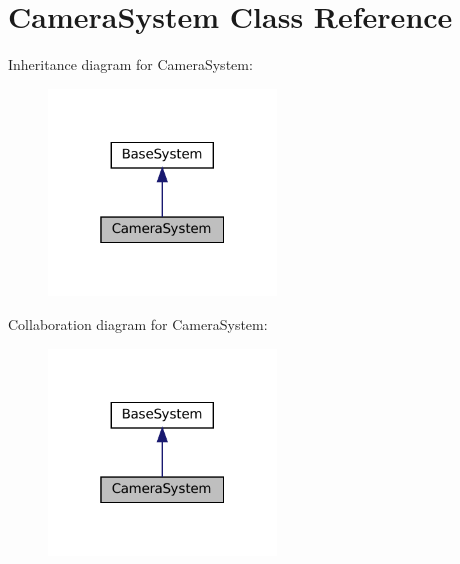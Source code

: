 \hypertarget{classCameraSystem}{}\section{Camera\+System Class Reference}
\label{classCameraSystem}


Inheritance diagram for Camera\+System\+:
\nopagebreak
\begin{figure}[H]
\begin{center}
\leavevmode
\includegraphics[width=172pt]{classCameraSystem__inherit__graph}
\end{center}
\end{figure}


Collaboration diagram for Camera\+System\+:
\nopagebreak
\begin{figure}[H]
\begin{center}
\leavevmode
\includegraphics[width=172pt]{classCameraSystem__coll__graph}
\end{center}
\end{figure}
